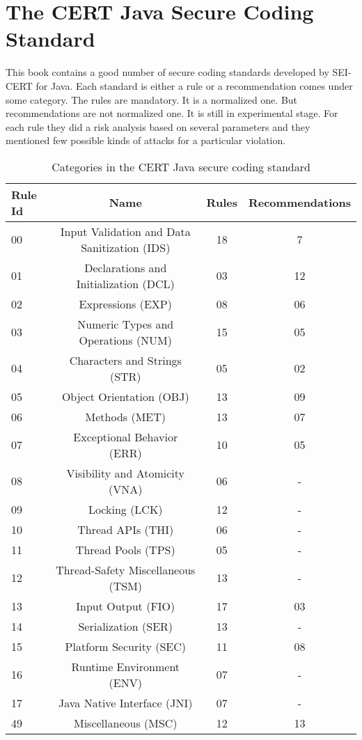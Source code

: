 \newpage

\section{The CERT Java Secure Coding Standard}
	This book \cite{cert-java} contains a good number of secure coding standards developed by SEI-CERT for Java. Each standard is either a rule or a recommendation comes under some category. The rules are mandatory. It is a normalized one. But recommendations are not normalized one. It is still in experimental stage. For each rule they did a risk analysis based on several parameters and they mentioned few possible kinds of attacks for a particular violation.
	
	\begin{table}[h!]
		\centering
		
		\label{tab:table1}
		\begin{tabular}{|l|c|c|c|}
			\hline
			\textbf{Rule Id} & \textbf{Name} & \textbf{Rules} & \textbf{Recommendations}\\
			\hline
			
			00 & Input Validation and Data Sanitization (IDS) & 18 & 7\\
			\hline
			
			01 & Declarations and Initialization (DCL) & 03 & 12\\
			\hline
			02 & Expressions (EXP) & 08 & 06\\
			\hline
			03 & Numeric Types and Operations (NUM) & 15 & 05\\
			\hline
			04 & Characters and Strings (STR) & 05 & 02\\
			\hline
			05 & Object Orientation (OBJ) & 13 & 09\\
			\hline
			06 & Methods (MET) & 13 & 07\\
			\hline
			07 & Exceptional Behavior (ERR) & 10 & 05\\
			\hline
			08 & Visibility and Atomicity (VNA) & 06 & -\\
			\hline
			09 & Locking (LCK) & 12 & -\\
			\hline
			10 & Thread APIs (THI) & 06 & -\\
			\hline
			11 & Thread Pools (TPS) & 05 & -\\
			\hline
			12 & Thread-Safety Miscellaneous (TSM) & 13 & -\\
			\hline
			13 & Input Output (FIO) & 17 & 03\\
			\hline
			14 & Serialization (SER) & 13 & -\\
			\hline
			15 & Platform Security (SEC) & 11 & 08\\
			\hline
			16 & Runtime Environment (ENV) & 07 & -\\
			\hline
			17 & Java Native Interface (JNI) & 07 & -\\
			\hline
			49 & Miscellaneous (MSC) & 12 & 13\\
			\hline
			
		\end{tabular}
		\caption{Categories in the CERT Java secure coding standard}
	\end{table}
	
